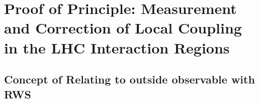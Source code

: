 








\section{Proof of Principle: Measurement and Correction of Local Coupling in the LHC Interaction Regions}

\subsection{Concept of Relating to outside observable with RWS}

